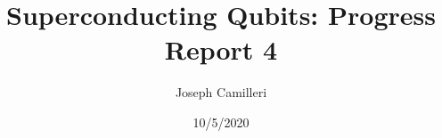 \documentclass[%
 reprint,
showpacs,
 amsmath,amssymb,
 aps,
longbibliography,
]{revtex4-1}
\begin{document}

\title{Superconducting Qubits: Progress Report 4}%

\author{Joseph Camilleri}
%

%

\date{10/5/2020}%
\end{document}
